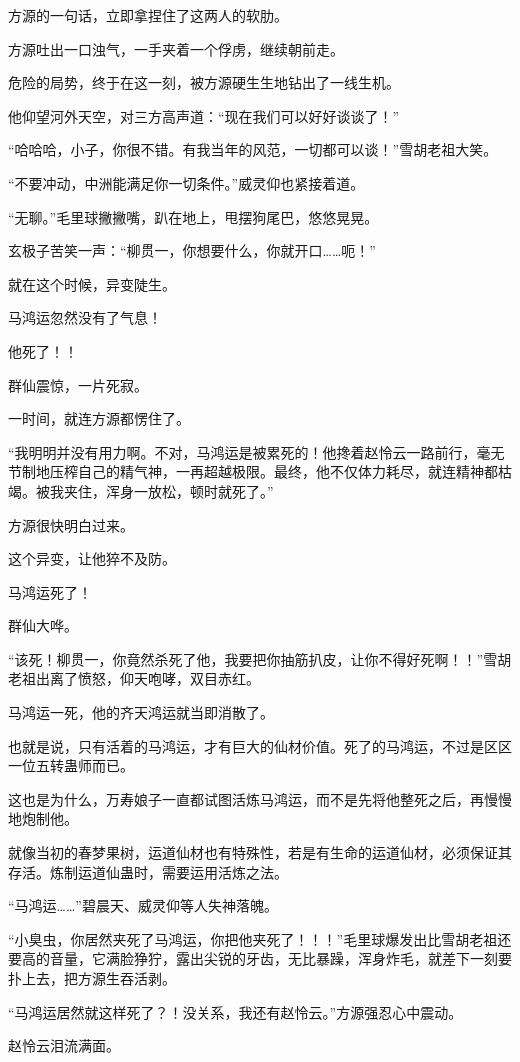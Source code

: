 \begin{this_body}
方源的一句话，立即拿捏住了这两人的软肋。

方源吐出一口浊气，一手夹着一个俘虏，继续朝前走。

危险的局势，终于在这一刻，被方源硬生生地钻出了一线生机。

他仰望河外天空，对三方高声道：“现在我们可以好好谈谈了！”

“哈哈哈，小子，你很不错。有我当年的风范，一切都可以谈！”雪胡老祖大笑。

“不要冲动，中洲能满足你一切条件。”威灵仰也紧接着道。

“无聊。”毛里球撇撇嘴，趴在地上，甩摆狗尾巴，悠悠晃晃。

玄极子苦笑一声：“柳贯一，你想要什么，你就开口……呃！”

就在这个时候，异变陡生。

马鸿运忽然没有了气息！

他死了！！

群仙震惊，一片死寂。

一时间，就连方源都愣住了。

“我明明并没有用力啊。不对，马鸿运是被累死的！他搀着赵怜云一路前行，毫无节制地压榨自己的精气神，一再超越极限。最终，他不仅体力耗尽，就连精神都枯竭。被我夹住，浑身一放松，顿时就死了。”

方源很快明白过来。

这个异变，让他猝不及防。

马鸿运死了！

群仙大哗。

“该死！柳贯一，你竟然杀死了他，我要把你抽筋扒皮，让你不得好死啊！！”雪胡老祖出离了愤怒，仰天咆哮，双目赤红。

马鸿运一死，他的齐天鸿运就当即消散了。

也就是说，只有活着的马鸿运，才有巨大的仙材价值。死了的马鸿运，不过是区区一位五转蛊师而已。

这也是为什么，万寿娘子一直都试图活炼马鸿运，而不是先将他整死之后，再慢慢地炮制他。

就像当初的春梦果树，运道仙材也有特殊性，若是有生命的运道仙材，必须保证其存活。炼制运道仙蛊时，需要运用活炼之法。

“马鸿运……”碧晨天、威灵仰等人失神落魄。

“小臭虫，你居然夹死了马鸿运，你把他夹死了！！！”毛里球爆发出比雪胡老祖还要高的音量，它满脸狰狞，露出尖锐的牙齿，无比暴躁，浑身炸毛，就差下一刻要扑上去，把方源生吞活剥。

“马鸿运居然就这样死了？！没关系，我还有赵怜云。”方源强忍心中震动。

赵怜云泪流满面。


\end{this_body}
